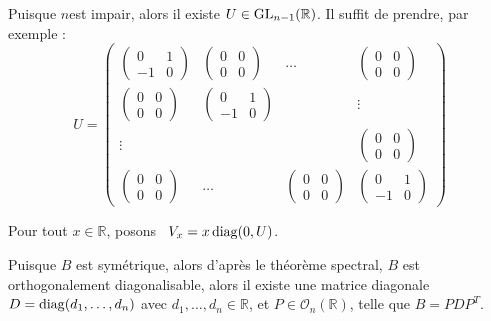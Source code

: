 Puisque $n$est impair, alors il existe $U \in \operatorname{GL}_{n - 1} (\mathbb{R})$.
Il suffit de prendre, par exemple :
\[ U = \left( \begin{array}{cccc}
     \left( \begin{array}{cc}
       0 & 1\\
       - 1 & 0
     \end{array} \right) & \left( \begin{array}{cc}
       0 & 0\\
       0 & 0
     \end{array} \right) & \ldots & \left( \begin{array}{cc}
       0 & 0\\
       0 & 0
     \end{array} \right)\\
     \left( \begin{array}{cc}
       0 & 0\\
       0 & 0
     \end{array} \right) & \left( \begin{array}{cc}
       0 & 1\\
       - 1 & 0
     \end{array} \right) &  & \vdots\\
     \vdots &  &  & \left( \begin{array}{cc}
       0 & 0\\
       0 & 0
     \end{array} \right)\\
     \left( \begin{array}{cc}
       0 & 0\\
       0 & 0
     \end{array} \right) & \ldots & \left( \begin{array}{cc}
       0 & 0\\
       0 & 0
     \end{array} \right) & \left( \begin{array}{cc}
       0 & 1\\
       - 1 & 0
     \end{array} \right)
   \end{array} \right) \]


Pour tout $x \in \mathbb{R}$, posons \ $V_x = x \operatorname{diag} (0, U)$.

Puisque $B$ est sym{\'e}trique, alors d'apr{\`e}s le th{\'e}or{\`e}me
spectral, $B$ est orthogonalement diagonalisable, alors il existe une matrice
diagonale $D = \operatorname{diag} (d_1, \ldots, d_n)$ avec $d_1, \ldots, d_n \in
\mathbb{R}$, et $P \in \mathcal{O}_n (\mathbb{R})$, telle que $B = P  D P^T$.

